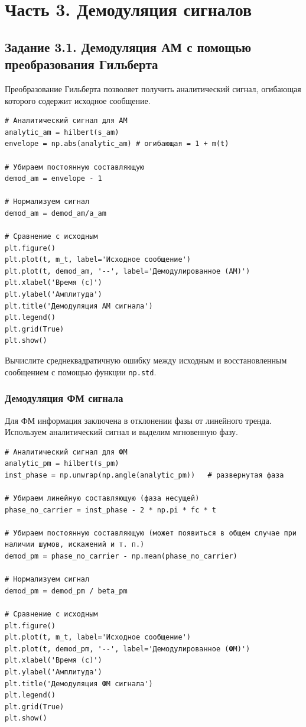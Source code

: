 \documentclass[12pt,a4paper,openany]{book}
\begin{document}
\section*{Часть 3. Демодуляция сигналов}

\subsection*{Задание 3.1. Демодуляция АМ с помощью преобразования Гильберта}

Преобразование Гильберта позволяет получить аналитический сигнал, огибающая которого содержит исходное сообщение.

\begin{Verbatim}[fontsize=\small, breaklines, breakanywhere, frame=single, framesep=2mm]
# Аналитический сигнал для АМ
analytic_am = hilbert(s_am)
envelope = np.abs(analytic_am) # огибающая = 1 + m(t)

# Убираем постоянную составляющую
demod_am = envelope - 1

# Нормализуем сигнал
demod_am = demod_am/a_am

# Сравнение с исходным
plt.figure()
plt.plot(t, m_t, label='Исходное сообщение')
plt.plot(t, demod_am, '--', label='Демодулированное (АМ)')
plt.xlabel('Время (с)')
plt.ylabel('Амплитуда')
plt.title('Демодуляция АМ сигнала')
plt.legend()
plt.grid(True)
plt.show()
\end{Verbatim}

Вычислите среднеквадратичную ошибку между исходным и восстановленным сообщением с помощью функции \texttt{np.\allowbreak{}std}.

\subsubsection*{Демодуляция ФМ сигнала}

Для ФМ информация заключена в отклонении фазы от линейного тренда. Используем аналитический сигнал и выделим мгновенную фазу.

\begin{Verbatim}[fontsize=\small, breaklines, breakanywhere, frame=single, framesep=2mm]
# Аналитический сигнал для ФМ
analytic_pm = hilbert(s_pm)
inst_phase = np.unwrap(np.angle(analytic_pm))   # развернутая фаза

# Убираем линейную составляющую (фаза несущей)
phase_no_carrier = inst_phase - 2 * np.pi * fc * t

# Убираем постоянную составляющую (может появиться в общем случае при наличии шумов, искажений и т. п.)
demod_pm = phase_no_carrier - np.mean(phase_no_carrier)

# Нормализуем сигнал
demod_pm = demod_pm / beta_pm

# Сравнение с исходным
plt.figure()
plt.plot(t, m_t, label='Исходное сообщение')
plt.plot(t, demod_pm, '--', label='Демодулированное (ФМ)')
plt.xlabel('Время (с)')
plt.ylabel('Амплитуда')
plt.title('Демодуляция ФМ сигнала')
plt.legend()
plt.grid(True)
plt.show()
\end{Verbatim}
\end{document}
